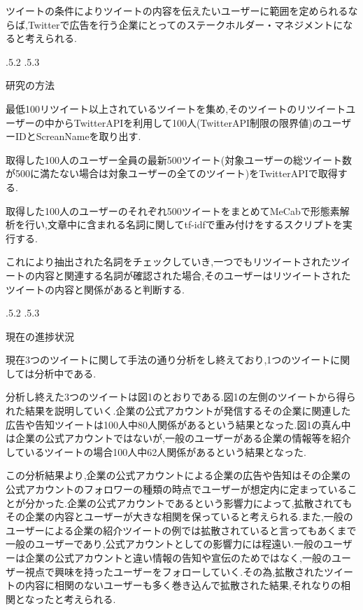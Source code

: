 \documentclass[uplatex]{jsarticle}
\makeatletter
\renewcommand{\section}{%
    \if@slide\clearpage\fi
    \@startsection{section}{1}{\z@}%
    {\Cvs \@plus.5\Cdp \@minus.2\Cdp}%
    {.5\Cvs \@plus.3\Cdp}%
    {\normalfont\raggedright}}
\makeatother
\begin{document}
ツイートの条件によりツイートの内容を伝えたいユーザーに範囲を定められるならば,Twitterで広告を行う企業にとってのステークホルダー・マネジメントになると考えられる.

\section{研究の方法}

最低100リツイート以上されているツイートを集め,そのツイートのリツイートユーザーの中からTwitterAPIを利用して100人(TwitterAPI制限の限界値)のユーザーIDとScreanNameを取り出す.

取得した100人のユーザー全員の最新500ツイート(対象ユーザーの総ツイート数が500に満たない場合は対象ユーザーの全てのツイート)をTwitterAPIで取得する.


取得した100人のユーザーのそれぞれ500ツイートをまとめてMeCabで形態素解析を行い,文章中に含まれる名詞に関してtf-idfで重み付けをするスクリプトを実行する.


これにより抽出された名詞をチェックしていき,一つでもリツイートされたツイートの内容と関連する名詞が確認された場合,そのユーザーはリツイートされたツイートの内容と関係があると判断する.


\section{現在の進捗状況}

現在3つのツイートに関して手法の通り分析をし終えており,1つのツイートに関しては分析中である.

分析し終えた3つのツイートは図1のとおりである.図1の左側のツイートから得られた結果を説明していく.企業の公式アカウントが発信するその企業に関連した広告や告知ツイートは100人中80人関係があるという結果となった.図1の真ん中は企業の公式アカウントではないが,一般のユーザーがある企業の情報等を紹介しているツイートの場合100人中62人関係があるという結果となった.

この分析結果より,企業の公式アカウントによる企業の広告や告知はその企業の公式アカウントのフォロワーの種類の時点でユーザーが想定内に定まっていることが分かった.企業の公式アカウントであるという影響力によって,拡散されてもその企業の内容とユーザーが大きな相関を保っていると考えられる.また,一般のユーザーによる企業の紹介ツイートの例では拡散されていると言ってもあくまで一般のユーザーであり,公式アカウントとしての影響力には程遠い.一般のユーザーは企業の公式アカウントと違い情報の告知や宣伝のためではなく,一般のユーザー視点で興味を持ったユーザーをフォローしていく.その為,拡散されたツイートの内容に相関のないユーザーも多く巻き込んで拡散された結果,それなりの相関となったと考えられる.
\end{document}
